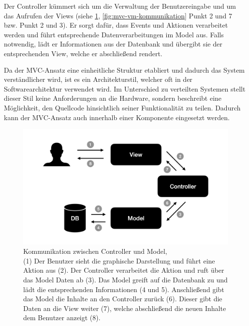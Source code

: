 Der Controller kümmert sich um die Verwaltung der Benutzereingabe und um das Aufrufen der Views (siehe \cref{fig:mvc-cm-kommunikation}, \cref{fig:mvc-vm-kommunikation} Punkt 2 und 7 bzw. Punkt 2 und 3). Er sorgt dafür, dass Events und Aktionen verarbeitet werden und führt entsprechende Datenverarbeitungen im Model aus. Falls notwendig, lädt er Informationen aus der Datenbank und übergibt sie der entsprechenden View, welche er abschließend rendert\footnotemark.


Da der MVC-Ansatz eine einheitliche Struktur etabliert und dadurch das System verständlicher wird, ist es ein Architekturstil, welcher oft in der Softwarearchitektur verwendet wird. Im Unterschied zu verteilten Systemen stellt dieser Stil keine Anforderungen an die Hardware, sondern beschreibt eine Möglichkeit, den Quellcode hinsichtlich seiner Funktionalität zu teilen. Dadurch kann der MVC-Ansatz auch innerhalb einer Komponente eingesetzt werden.

\begin{figure}
	\centering
	\includegraphics[width=.6\textwidth]{Assets/Interaktionsorientiert.001}
	\caption[Kommunikation zwischen Controller und Model]{Kommunikation zwischen Controller und Model, \\ (1) Der Benutzer sieht die graphische Darstellung und führt eine Aktion aus (2). Der Controller verarbeitet die Aktion und ruft über das Model Daten ab (3). Das Model greift auf die Datenbank zu und lädt die entsprechenden Informationen (4 und 5). Anschließend gibt das Model die Inhalte an den Controller zurück (6). Dieser gibt die Daten an die View weiter (7), welche abschließend die neuen Inhalte dem Benutzer anzeigt (8).}
	\label{fig:mvc-cm-kommunikation}
 \end{figure}
 
